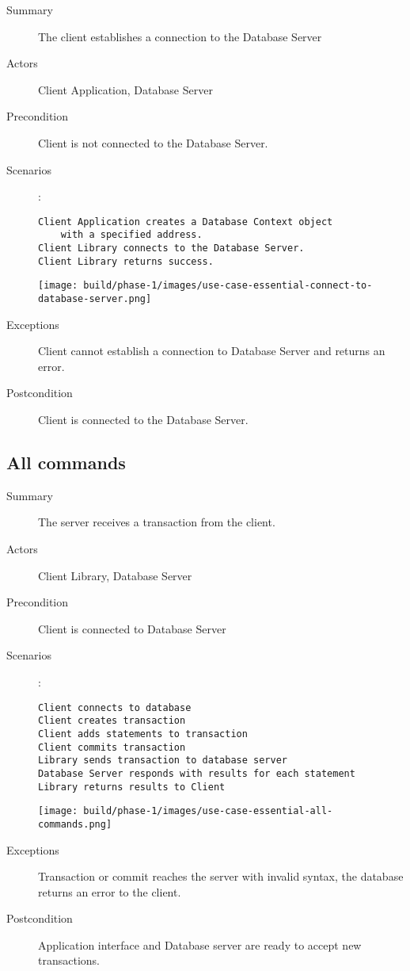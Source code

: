 \documentclass[a4paper]{report}
\begin{document}
	\begin{description}
		\item[Summary] The client establishes a connection to the Database Server
		\item[Actors] Client Application, Database Server 
		\item[Precondition] Client is not connected to the Database Server.
		\item[Scenarios] :
		
		\begin{lstlisting}
Client Application creates a Database Context object
	with a specified address.
Client Library connects to the Database Server.
Client Library returns success.
		\end{lstlisting}

		\begin{center}
			\texttt{[image: build/phase-1/images/use-case-essential-connect-to-database-server.png]}
		\end{center}

		\item[Exceptions] Client cannot establish a connection to Database Server and returns an error.
		\item[Postcondition] Client is connected to the Database Server.
	\end{description}

	\pagebreak

	\subsection{All commands}

	\begin{description}
		\item[Summary] The server receives a transaction from the client.
		\item[Actors] Client Library, Database Server
		\item[Precondition] Client is connected to Database Server
		\item[Scenarios] :

		\begin{lstlisting}
Client connects to database
Client creates transaction
Client adds statements to transaction
Client commits transaction
Library sends transaction to database server
Database Server responds with results for each statement
Library returns results to Client
		\end{lstlisting}

		\begin{center}
			\texttt{[image: build/phase-1/images/use-case-essential-all-commands.png]}
		\end{center}

		\item[Exceptions] Transaction or commit reaches the server with invalid syntax, the database returns an error to the client.
		\item[Postcondition] Application interface and Database server are ready to accept new transactions.
	\end{description}
	
\end{document}
